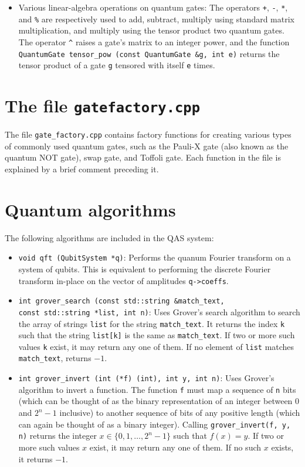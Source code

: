 \documentclass{article}
\begin{document}
\begin{itemize}
\item Various linear-algebra operations on quantum gates: The operators \verb~+~, \verb~-~, \verb~*~, and \verb~%~ are respectively used to add, subtract, multiply using standard matrix multiplication, and multiply using the tensor product two quantum gates. The operator \verb~^~ raises a gate's matrix to an integer power, and the function \verb~QuantumGate tensor_pow (const QuantumGate &g, int e)~ returns the tensor product of a gate \verb~g~ tensored with itself \verb~e~ times. 

\end{itemize} 


\section{The file \texttt{gate\textunderscore{}factory.cpp}} 

The file \verb~gate_factory.cpp~ contains factory functions for creating various types of commonly used quantum gates, such as the Pauli-X gate (also known as the quantum NOT gate), swap gate, and Toffoli gate. Each function in the file is explained by a brief comment preceding it. 


\section{Quantum algorithms} 

The following algorithms are included in the QAS system: 
\begin{itemize} 
\item \verb~void qft (QubitSystem *q)~: Performs the quanum Fourier transform on a system of qubits. This is equivalent to performing the discrete Fourier transform in-place on the vector of amplitudes \verb~q->coeffs~. 

\item \verb~int grover_search (const std::string &match_text,~ \\
\verb~const std::string *list, int n)~: Uses Grover's search algorithm to search the array of strings \verb~list~ for the string \verb~match_text~. It returns the index \verb~k~ such that the string \verb~list[k]~ is the same as \verb~match_text~. If two or more such values \verb~k~ exist, it may return any one of them. If no element of \verb~list~ matches \verb~match_text~, returns $-1$. 

\item \verb~int grover_invert (int (*f) (int), int y, int n)~: Uses Grover's algorithm to invert a function. The function \verb~f~ must map a sequence of \verb~n~ bits (which can be thought of as the binary representation of an integer between 0 and $2^n - 1$ inclusive) to another sequence of bits of any positive length (which can again be thought of as a binary integer). Calling \verb~grover_invert(f, y, n)~ returns the integer $x \in \{0, 1, \dots, 2^n-1\}$ such that $f(x) = y$. If two or more such values $x$ exist, it may return any one of them. If no such $x$ exists, it returns $-1$. 

\end{itemize} 
\end{document}
